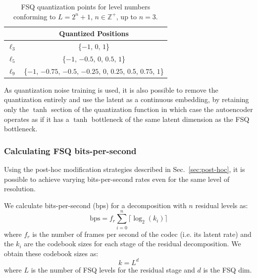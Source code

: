 \documentclass{article} %
\begin{document}
\begin{table}
    \centering
    \vspace{-1em}
    \begin{tabular}{@{}c@{\hskip 5pt}c@{}}
        \toprule
         & \textbf{Quantized Positions} \\ 
        \midrule
        $\ell_3$   & \{$-1$, $0$, $1$\}   \\ 
        $\ell_5$   & \{$-1$, \textbf{$-0.5$}, $0$, \textbf{$0.5$}, $1$\}   \\ 
        $\ell_9$   & \{$-1$, \textbf{$-0.75$}, $-0.5$, \textbf{$-0.25$}, $0$, \textbf{$0.25$}, 0.5, \textbf{$0.75$}, $1$\}   \\ 
        \bottomrule
    \end{tabular}
    \caption{FSQ quantization points for level numbers conforming to $L=2^n +1$, $n \in \mathbb{Z}^+$, up to $n=3$.}
    \label{tab:fsq_quantized_levels}
    \vspace{-8mm}
\end{table}

As quantization noise training \citep{brendel2024} is used, it is also possible to remove the quantization entirely and use the latent as a continuous embedding, by retaining only the $\tanh$ section of the quantization function in which case the autoencoder operates as if it has a $\tanh$ bottleneck of the same latent dimension as the FSQ bottleneck. 
\subsubsection{Calculating FSQ bits-per-second}

\label{sec:bps}
Using the post-hoc modification strategies described in Sec.~\ref{sec:post-hoc}, it is possible to achieve varying bits-per-second rates even for the same level of resolution.

We calculate bits-per-second (bps) for a decomposition with $n$ residual levels as:
\begin{equation}
    \text{bps} = f_r \sum_{i=0}^n \lceil \log_2(k_i) \rceil
\end{equation}
where $f_r$ is the number of frames per second of the codec (i.e. its latent rate) and the $k_i$ are the codebook sizes for each stage of the residual decomposition. We obtain these codebook sizes as:
\begin{equation}
k = L ^ d
\end{equation}
where $L$ is the number of FSQ levels for the residual stage and $d$ is the FSQ dim.
\end{document}
